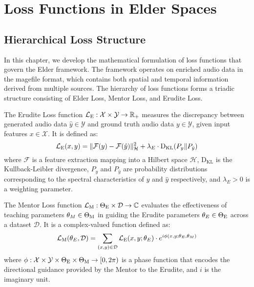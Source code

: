 \chapter{Loss Functions in Elder Spaces}

\section{Hierarchical Loss Structure}

In this chapter, we develop the mathematical formulation of loss functions that govern the Elder framework. The framework operates on enriched audio data in the magefile format, which contains both spatial and temporal information derived from multiple sources. The hierarchy of loss functions forms a triadic structure consisting of Elder Loss, Mentor Loss, and Erudite Loss.

\begin{definition}
The Erudite Loss function $\mathcal{L}_{\text{E}}: \mathcal{X} \times \mathcal{Y} \rightarrow \mathbb{R}_+$ measures the discrepancy between generated audio data $\hat{y} \in \mathcal{Y}$ and ground truth audio data $y \in \mathcal{Y}$, given input features $x \in \mathcal{X}$. It is defined as:
\begin{equation}
\mathcal{L}_{\text{E}}(x, y) = \| \mathcal{F}(y) - \mathcal{F}(\hat{y}) \|_{\mathcal{H}}^2 + \lambda_E \cdot \mathrm{D_{KL}}(P_y \| P_{\hat{y}})
\end{equation}
where $\mathcal{F}$ is a feature extraction mapping into a Hilbert space $\mathcal{H}$, $\mathrm{D_{KL}}$ is the Kullback-Leibler divergence, $P_y$ and $P_{\hat{y}}$ are probability distributions corresponding to the spectral characteristics of $y$ and $\hat{y}$ respectively, and $\lambda_E > 0$ is a weighting parameter.
\end{definition}

\begin{definition}
The Mentor Loss function $\mathcal{L}_{\text{M}}: \Theta_{\text{E}} \times \mathcal{D} \rightarrow \mathbb{C}$ evaluates the effectiveness of teaching parameters $\theta_M \in \Theta_{\text{M}}$ in guiding the Erudite parameters $\theta_E \in \Theta_{\text{E}}$ across a dataset $\mathcal{D}$. It is a complex-valued function defined as:
\begin{equation}
\mathcal{L}_{\text{M}}(\theta_E, \mathcal{D}) = \sum_{(x,y) \in \mathcal{D}} \mathcal{L}_{\text{E}}(x, y; \theta_E) \cdot e^{i\phi(x,y;\theta_E,\theta_M)}
\end{equation}
where $\phi: \mathcal{X} \times \mathcal{Y} \times \Theta_{\text{E}} \times \Theta_{\text{M}} \rightarrow [0, 2\pi)$ is a phase function that encodes the directional guidance provided by the Mentor to the Erudite, and $i$ is the imaginary unit.
\end{definition}

